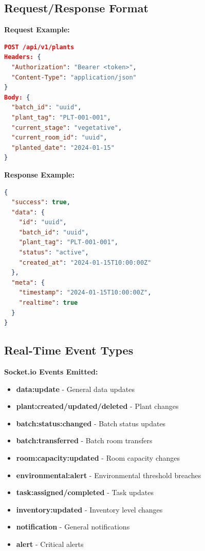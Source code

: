 \documentclass[11pt,a4paper]{article}
\begin{document}
\subsection{Request/Response Format}

\textbf{Request Example:}
\begin{lstlisting}[language=JSON, caption=POST /api/v1/plants]
POST /api/v1/plants
Headers: {
  "Authorization": "Bearer <token>",
  "Content-Type": "application/json"
}
Body: {
  "batch_id": "uuid",
  "plant_tag": "PLT-001-001",
  "current_stage": "vegetative",
  "current_room_id": "uuid",
  "planted_date": "2024-01-15"
}
\end{lstlisting}

\textbf{Response Example:}
\begin{lstlisting}[language=JSON]
{
  "success": true,
  "data": {
    "id": "uuid",
    "batch_id": "uuid",
    "plant_tag": "PLT-001-001",
    "status": "active",
    "created_at": "2024-01-15T10:00:00Z"
  },
  "meta": {
    "timestamp": "2024-01-15T10:00:00Z",
    "realtime": true
  }
}
\end{lstlisting}

\subsection{Real-Time Event Types}
\begin{realtimebox}
\textbf{Socket.io Events Emitted:}
\begin{itemize}
    \item \textbf{data:update} - General data updates
    \item \textbf{plant:created/updated/deleted} - Plant changes
    \item \textbf{batch:status:changed} - Batch status updates
    \item \textbf{batch:transferred} - Batch room transfers
    \item \textbf{room:capacity:updated} - Room capacity changes
    \item \textbf{environmental:alert} - Environmental threshold breaches
    \item \textbf{task:assigned/completed} - Task updates
    \item \textbf{inventory:updated} - Inventory level changes
    \item \textbf{notification} - General notifications
    \item \textbf{alert} - Critical alerts
\end{itemize}
\end{realtimebox}
\end{document}
